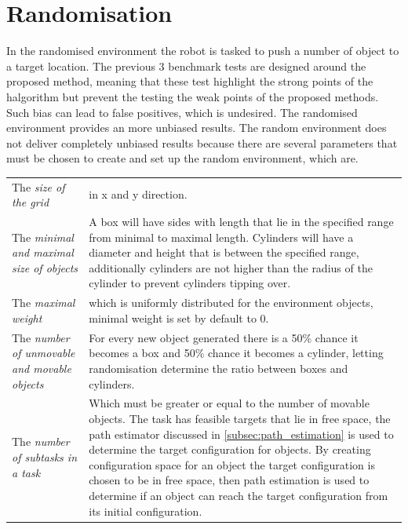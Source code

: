 \section{Randomisation}%
\label{sec:randomisation}
In the randomised environment the robot is tasked to push a number of object to a target location. The previous 3 benchmark tests are designed around the proposed method, meaning that these test highlight the strong points of the \ac{halgorithm} but prevent the testing the weak points of the proposed methods. Such bias can lead to false positives, which is undesired. The randomised environment provides an more unbiased results. The random environment does not deliver completely unbiased results because there are several parameters that must be chosen to create and set up the random environment, which are.\\


\noindent
\begin{table}[H]
\centering
\begin{tabular}%
{>{\raggedright\arraybackslash}p{}%
>{\raggedright\arraybackslash}p{}}
The \textit{size of the grid} & in \gls{x} and \gls{y} direction.\\
The \textit{minimal and maximal size of objects} & A box will have sides with length that lie in the specified range from minimal to maximal length. Cylinders will have a diameter and height that is between the specified range, additionally cylinders are not higher than the radius of the cylinder to prevent cylinders tipping over. \\
The \textit{maximal weight} & which is uniformly distributed for the environment objects, minimal weight is set by default to 0. \\
The \textit{number of unmovable and movable objects} & For every new object generated there is a 50\% chance it becomes a box and 50\% chance it becomes a cylinder, letting randomisation determine the ratio between boxes and cylinders. \\
The \textit{number of subtasks in a task} & Which must be greater or equal to the number of movable objects. The task has feasible targets that lie in free space, the path estimator discussed in \cref{subsec:path_estimation} is used to determine the target configuration for objects. By creating configuration space for an object the target configuration is chosen to be in free space, then path estimation is used to determine if an object can reach the target configuration from its initial configuration.  
\end{tabular}
\end{table}

